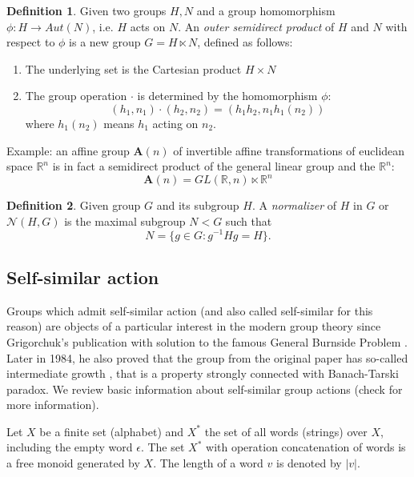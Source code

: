 \documentclass[a4paper,12pt]{amsart}
\theoremstyle{definition}
\newtheorem{definition}{Definition}
\begin{document}
	
	\begin{definition}
		Given two groups $H, N$ and a group homomorphism $\phi : H \rightarrow Aut(N)$, i.e. $H$ acts on $N$. An \textit{outer semidirect product} of $H$ and $N$ with respect to $\phi$ is a new group $G = H \ltimes N$, defined as follows: 
		
		\begin{enumerate}[label=\arabic*.]
			\item The underlying set is the Cartesian product $H \times N$
			\item The group operation $\cdot$ is determined by the homomorphism $\phi$: 
			$$
			(h_1, n_1) \cdot (h_2, n_2) = (h_1 h_2, n_1 h_1(n_2))
			$$
			where $h_1 (n_2)$ means $h_1$ acting on $n_2$.
		\end{enumerate}
		
		Example: an affine group $\mathbf{A}(n)$ of invertible affine transformations of euclidean space $\mathbb{R}^n$ is in fact a semidirect product of the general linear group and the $\mathbb{R}^n$: 
		$$\mathbf{A}(n) = GL(\mathbb{R}, n) \ltimes \mathbb{R}^n$$
		
	\end{definition}
	
	
	\begin{definition}
		Given group $G$ and its subgroup $H$. A \textit{normalizer} of $H$ in $G$ or $\mathcal{N}(H, G)$ is the maximal subgroup $N < G$ such that 
		$$
		N = \{g \in G : g^{-1}Hg = H\}.
		$$
	\end{definition}
	
	\subsection{Self-similar action}
	
	Groups which admit self-similar action (and also called self-similar for this reason) are objects of a particular interest in the modern group theory since Grigorchuk's publication with solution to the famous General Burnside Problem \cite{Grygorchuk:original}. Later in 1984, he also proved that the group from the original paper has so-called intermediate growth \cite{Grygorchuk:growth}, that is a property strongly connected with Banach-Tarski paradox. We review basic information about self-similar group actions (check \cite{Nekrashevych:self-similar} for more information).
	
	
	Let $X$ be a finite set (alphabet) and $X^{*}$ the set of all words (strings) over $X$, including the empty word $\epsilon$. The set $X^{*}$ with operation concatenation of words is a free monoid generated by $X$. The length of a word $v$ is denoted by $|v|$.
	
\end{document}
